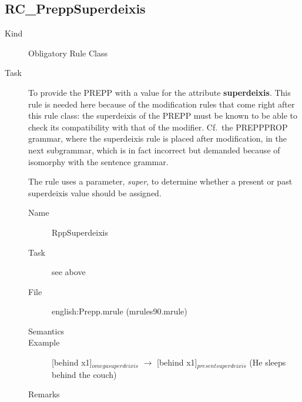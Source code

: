 \begin{description}
\end{description}

\newpage
\subsection{RC\_PreppSuperdeixis}
\begin{description}
\item[Kind] Obligatory Rule Class
\item[Task] To provide the PREPP with a value for the attribute {\bf 
superdeixis}. This rule is needed here because of the modification rules that 
come right after this rule class: 
the superdeixis of the PREPP must be known to be able to check its 
compatibility with that of the modifier. Cf.\ the PREPPPROP grammar, where 
the superdeixis rule is placed after modification, in the next subgrammar, 
which is in fact incorrect but demanded because of isomorphy with the sentence 
grammar.

The rule uses a 
parameter, {\em super\/}, to determine whether a present or past superdeixis 
value should be assigned.

\vspace{1 cm}
\begin{description}
\item[Name] RppSuperdeixis
\item[Task] see above
\item[File] english:Prepp.mrule (mrules90.mrule)
\item[Semantics]
\item[Example] [behind x1]$_{omegasuperdeixis}$ $\rightarrow$ [behind 
x1]$_{presentsuperdeixis}$ (He sleeps behind the couch)
\item[Remarks]
\end{description}

\end{description}

\newpage
